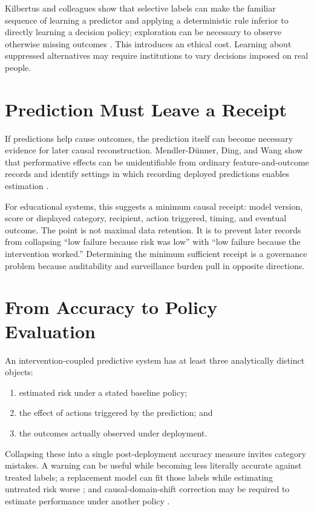 \documentclass[11pt]{article}
\begin{document}
Kilbertus and colleagues show that selective labels can make the familiar sequence
of learning a predictor and applying a deterministic rule inferior to directly
learning a decision policy; exploration can be necessary to observe otherwise
missing outcomes \parencite{pmlr-v108-kilbertus20a}. This introduces an ethical
cost. Learning about suppressed alternatives may require institutions to vary
decisions imposed on real people.

\section{Prediction Must Leave a Receipt}
If predictions help cause outcomes, the prediction itself can become necessary
evidence for later causal reconstruction. Mendler-Dünner, Ding, and Wang show that
performative effects can be unidentifiable from ordinary feature-and-outcome records
and identify settings in which recording deployed predictions enables estimation
\parencite{mendlerdunner2022anticipating}.

For educational systems, this suggests a minimum causal receipt: model version,
score or displayed category, recipient, action triggered, timing, and eventual
outcome. The point is not maximal data retention. It is to prevent later records
from collapsing ``low failure because risk was low'' with ``low failure because the
intervention worked.'' Determining the minimum sufficient receipt is a governance
problem because auditability and surveillance burden pull in opposite directions.

\section{From Accuracy to Policy Evaluation}
An intervention-coupled predictive system has at least three analytically distinct
objects:
\begin{enumerate}[label=(\arabic*)]
\item estimated risk under a stated baseline policy;
\item the effect of actions triggered by the prediction; and
\item the outcomes actually observed under deployment.
\end{enumerate}
Collapsing these into a single post-deployment accuracy measure invites category
mistakes. A warning can be useful while becoming less literally accurate against
treated labels; a replacement model can fit those labels while estimating untreated
risk worse \parencite{pmlr-v130-liley21a}; and causal-domain-shift correction may be
required to estimate performance under another policy
\parencite{pmlr-v236-boeken24a}.
\end{document}
